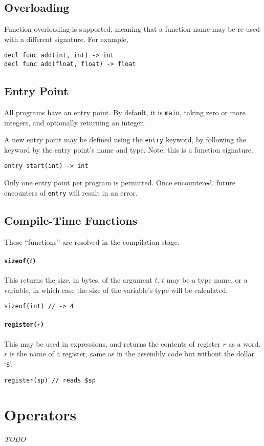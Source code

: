 \documentclass{article}
\begin{document}
\subsection{Overloading}

Function overloading is supported, meaning that a function name may be re-used with a different signature.
For example,

\begin{lstlisting}[language=CustomLang]
decl func add(int, int) -> int
decl func add(float, float) -> float
\end{lstlisting}

\subsection{Entry Point}

All programs have an entry point.
By default, it is \texttt{main}, taking zero or more integers, and optionally returning an integer.

A new entry point may be defined using the \texttt{entry} keyword, by following the keyword by the entry point's name and type.
Note, this is a function signature.

\begin{lstlisting}[language=CustomLang]
entry start(int) -> int
\end{lstlisting}

Only one entry point per program is permitted.
Once encountered, future encounters of \texttt{entry} will result in an error.

\subsection{Compile-Time Functions}

These ``functions'' are resolved in the compilation stage.

\paragraph*{\texttt{sizeof(\(t\))}}
This returns the size, in bytes, of the argument \(t\).
\(t\) may be a type name, or a variable, in which case the size of the variable's type will be calculated.

\begin{lstlisting}[language=CustomLang]
sizeof(int) // -> 4
\end{lstlisting}

\paragraph*{\texttt{register(\(r\))}}
This may be used in expressions, and returns the contents of register \(r\) as a word.
\(r\) is the name of a register, same as in the assembly code but without the dollar `\texttt{\$}'.

\begin{lstlisting}[language=CustomLang]
register(sp) // reads $sp
\end{lstlisting}

\section{Operators}

\textit{TODO}
\end{document}
